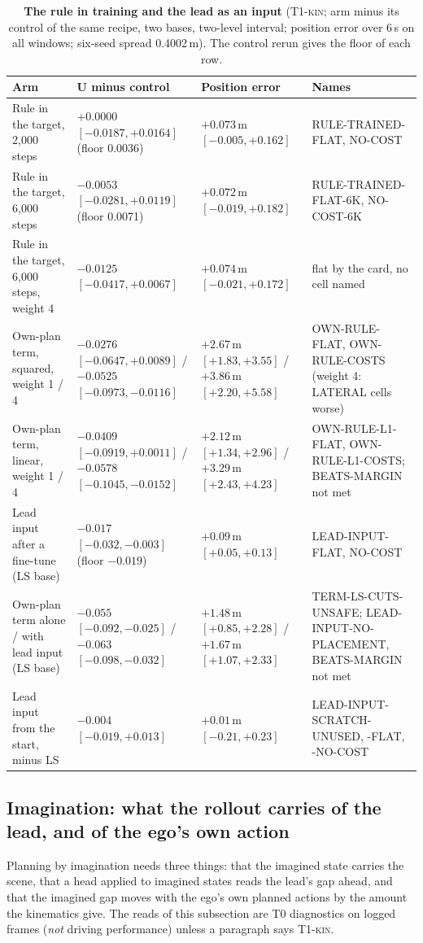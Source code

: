 \documentclass[10pt,twocolumn]{article}
\theoremstyle{remark}
\newcommand{\tier}[1]{\textsc{\small #1}}
\begin{document}
\begin{table}[!tp]
\centering
\caption{\textbf{The rule in training and the lead as an input} (\tier{T1-kin}; arm minus its control of the same recipe, two bases, two-level interval; position error over 6\,s on all windows; six-seed spread 0.4002\,m). The control rerun gives the floor of each row.}
\label{tab:ruletrain}
\scriptsize
\begin{tabularx}{\textwidth}{@{}>{\raggedright\arraybackslash}p{40mm}>{\raggedright\arraybackslash}X>{\raggedright\arraybackslash}X>{\raggedright\arraybackslash}X@{}}
\toprule
Arm & U minus control & Position error & Names \\
\midrule
Rule in the target, 2,000 steps & $+0.0000$ $[-0.0187,+0.0164]$ (floor 0.0036) & $+0.073$\,m $[-0.005,+0.162]$ & RULE-TRAINED-FLAT, NO-COST \\
Rule in the target, 6,000 steps & $-0.0053$ $[-0.0281,+0.0119]$ (floor 0.0071) & $+0.072$\,m $[-0.019,+0.182]$ & RULE-TRAINED-FLAT-6K, NO-COST-6K \\
Rule in the target, 6,000 steps, weight 4 & $-0.0125$ $[-0.0417,+0.0067]$ & $+0.074$\,m $[-0.021,+0.172]$ & flat by the card, no cell named \\
Own-plan term, squared, weight 1 / 4 & $-0.0276$ $[-0.0647,+0.0089]$ / $-0.0525$ $[-0.0973,-0.0116]$ & $+2.67$\,m $[+1.83,+3.55]$ / $+3.86$\,m $[+2.20,+5.58]$ & OWN-RULE-FLAT, OWN-RULE-COSTS (weight 4: LATERAL cells worse) \\
Own-plan term, linear, weight 1 / 4 & $-0.0409$ $[-0.0919,+0.0011]$ / $-0.0578$ $[-0.1045,-0.0152]$ & $+2.12$\,m $[+1.34,+2.96]$ / $+3.29$\,m $[+2.43,+4.23]$ & OWN-RULE-L1-FLAT, OWN-RULE-L1-COSTS; BEATS-MARGIN not met \\
Lead input after a fine-tune (LS base) & $-0.017$ $[-0.032,-0.003]$ (floor $-0.019$) & $+0.09$\,m $[+0.05,+0.13]$ & LEAD-INPUT-FLAT, NO-COST \\
Own-plan term alone / with lead input (LS base) & $-0.055$ $[-0.092,-0.025]$ / $-0.063$ $[-0.098,-0.032]$ & $+1.48$\,m $[+0.85,+2.28]$ / $+1.67$\,m $[+1.07,+2.33]$ & TERM-LS-CUTS-UNSAFE; LEAD-INPUT-NO-PLACEMENT, BEATS-MARGIN not met \\
Lead input from the start, minus LS & $-0.004$ $[-0.019,+0.013]$ & $+0.01$\,m $[-0.21,+0.23]$ & LEAD-INPUT-SCRATCH-UNUSED, -FLAT, -NO-COST \\
\bottomrule
\end{tabularx}
\end{table}

\subsection{Imagination: what the rollout carries of the lead, and of the ego's own action}\label{sec:imag}
Planning by imagination needs three things: that the imagined state carries the scene, that a head applied to imagined states reads the lead's gap ahead, and that the imagined gap moves with the ego's own planned actions by the amount the kinematics give. The reads of this subsection are \tier{T0} diagnostics on logged frames (\emph{not} driving performance) unless a paragraph says \tier{T1-kin}.
\end{document}
